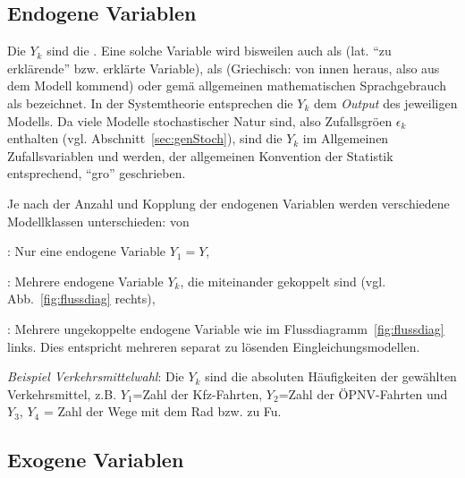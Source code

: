 
\subsection{Endogene Variablen}

Die $Y_k$ sind die .  Eine solche
Variable wird
bisweilen auch als  (lat. ``zu erkl\"arende''
bzw. erkl\"arte Variable), als
 (Griechisch: von innen heraus, also aus dem
Modell kommend) oder gem\"a\3 allgemeinen mathematischen Sprachgebrauch als
 bezeichnet. In der Systemtheorie
entsprechen die $Y_k$ dem \textit{Output} des jeweiligen Modells.
Da viele Modelle stochastischer Natur sind, also Zufallsgr\"o\3en
$\epsilon_k$ enthalten (vgl. Abschnitt~\ref{sec:genStoch}), 
sind die $Y_k$ im Allgemeinen Zufallsvariablen und
werden, der allgemeinen Konvention der Statistik entsprechend,
``gro\3'' geschrieben.

Je nach der Anzahl und Kopplung der endogenen Variablen werden
verschiedene Modellklassen unterschieden:
von
\bi
\item {}: Nur eine endogene Variable
$Y_1=Y$,
\item {}: Mehrere endogene  Variable $Y_k$, die
miteinander gekoppelt sind (vgl. Abb.~\ref{fig:flussdiag} rechts),
\item {}: Mehrere ungekoppelte
endogene Variable wie im
Flussdiagramm~\ref{fig:flussdiag} links. Dies entspricht mehreren
separat zu l\"osenden Eingleichungsmodellen.
\ei

\textit{Beispiel Verkehrsmittelwahl}: Die $Y_k$ sind die absoluten
H\"aufigkeiten der gew\"ahlten Verkehrsmittel, z.B. $Y_1$=Zahl der
Kfz-Fahrten, $Y_2$=Zahl der \"OPNV-Fahrten und $Y_3$, $Y_4$ = Zahl der
Wege mit dem Rad bzw. zu Fu\3.

\subsection{Exogene Variablen}

